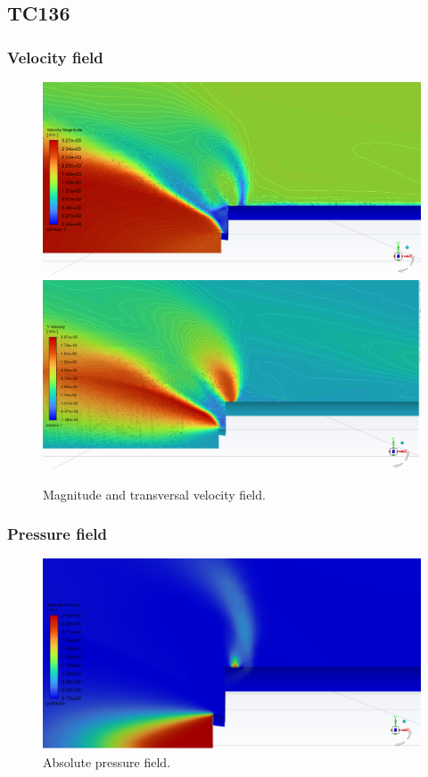 \documentclass[12pt]{article}
\begin{document}
\subsection{TC136}\label{sec:TC136}

\subsubsection*{Velocity field}

\begin{figure}[H]
    \centering
    \includegraphics[width=0.495\linewidth]{figs/t136s/Vmag.PNG}
    \includegraphics[width=0.495\linewidth]{figs/t136s/V.PNG}
    \caption{Magnitude and transversal velocity field.}
    \label{fig:enter-label}
\end{figure}

\subsubsection*{Pressure field}

\begin{figure}[H]
    \centering
    \includegraphics[width=\linewidth]{figs/t136s/pabs2.PNG}
    \caption{Absolute pressure field.}
    \label{fig:enter-label}
\end{figure}
\end{document}
